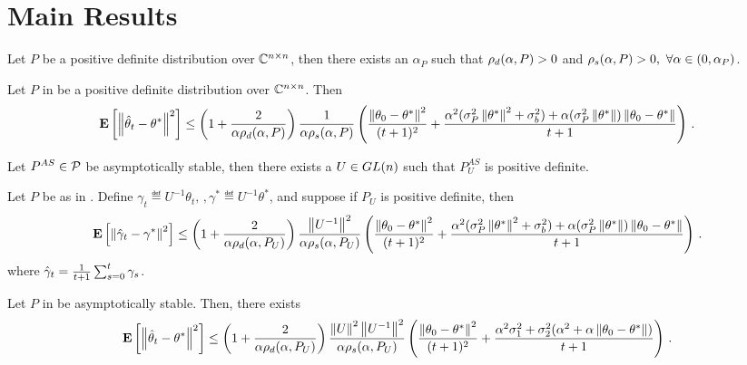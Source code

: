 \documentclass{article}
\begin{document}
\section{Main Results}
\begin{lemma}
Let $P$ be a positive definite distribution over $\C^{\ncn}$, then there exists an $\alpha_P$ such that $\rhod{P}>0$ and $\rhos{P}>0,~\forall \alpha \in (0,\alpha_P)$.
\end{lemma}
\begin{theorem}
Let $P$ in  be a positive definite distribution over $\C^{\ncn}$. Then
\begin{align}
\EE{\norm{\thh_t-\theta^*}^2}
\leq
\left(1+\frac2{\alpha\rhod{P}}\right)\frac{1}{\alpha \rhos{P}}
\left(\frac{\norm{\theta_0-\theta^*}^2}{(t+1)^2}+ \frac{\alpha^2(\sigma_P^2\norm{\ts}^2+\sigma_b^2)+\alpha (\sigma_P^2\norm{\ts})\norm{\theta_0-\theta^*}}{t+1} \right)\,.
\end{align}

\end{theorem}

\begin{lemma}
Let $P^{AS}\in\P$ be asymptotically stable, then there exists a $U\in \gln$ such that $P^{AS}_U$ is positive definite.
\end{lemma}

\begin{theorem}
Let $P$ be as in . Define $\gamma_t\eqdef U^{-1}\theta_t,\,,\gamma^*\eqdef U^{-1}\theta^*$, and suppose if $P_U$ is positive definite, then
\begin{align}
\EE{\norm{\gh_t-\gamma^*}^2}
\leq
\left(1+\frac2{\alpha\rhod{P_U}}\right)\frac{\norm{U^{-1}}^2}{\alpha \rhos{P_U}}
\left(\frac{\norm{\theta_0-\ts}^2}{(t+1)^2}+ \frac{\alpha^2(\sigma_P^2\norm{\ts}^2+\sigma_b^2)+\alpha (\sigma_P^2\norm{\ts})\norm{\theta_0-\ts}}{t+1} \right)\,.
\end{align}
where $\gh_t=\frac{1}{t+1}\sum_{s=0}^t \gamma_s$.
\end{theorem}
\begin{corollary}
Let $P$ in  be asymptotically stable. Then, there exists
\begin{align}
\EE{\norm{\thh_t-\theta^*}^2}
\leq
\left(1+\frac2{\alpha\rhod{P_U}}\right)\frac{\norm{U}^2\norm{U^{-1}}^2}{\alpha \rhos{P_U}} \left(\frac{\norm{\theta_0-\theta^*}^2}{(t+1)^2}+ \frac{\alpha^2{\sigma}_1^2+ {\sigma}_2^2 (\alpha^2+\alpha \norm{\theta_0-\theta^*})}{t+1} \right)\,.
\end{align}
\end{corollary}
\end{document}
